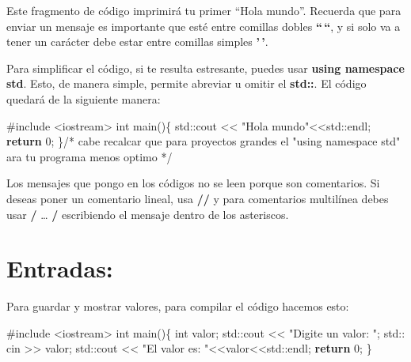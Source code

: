 \documentclass[
  11pt,
  a4paper,
  DIV=11,
  numbers=noendperiod]{scrreprt}
\newenvironment{Shaded}{\begin{snugshade}}{\end{snugshade}}
\newcommand{\BuiltInTok}[1]{\textcolor[rgb]{0.00,0.23,0.31}{#1}}
\newcommand{\CommentTok}[1]{\textcolor[rgb]{0.37,0.37,0.37}{#1}}
\newcommand{\ControlFlowTok}[1]{\textcolor[rgb]{0.00,0.23,0.31}{\textbf{#1}}}
\newcommand{\DataTypeTok}[1]{\textcolor[rgb]{0.68,0.00,0.00}{#1}}
\newcommand{\DecValTok}[1]{\textcolor[rgb]{0.68,0.00,0.00}{#1}}
\newcommand{\ImportTok}[1]{\textcolor[rgb]{0.00,0.46,0.62}{#1}}
\newcommand{\NormalTok}[1]{\textcolor[rgb]{0.00,0.23,0.31}{#1}}
\newcommand{\OperatorTok}[1]{\textcolor[rgb]{0.37,0.37,0.37}{#1}}
\newcommand{\PreprocessorTok}[1]{\textcolor[rgb]{0.68,0.00,0.00}{#1}}
\newcommand{\StringTok}[1]{\textcolor[rgb]{0.13,0.47,0.30}{#1}}
\begin{document}
Este fragmento de código imprimirá tu primer ``Hola mundo''. Recuerda
que para enviar un mensaje es importante que esté entre comillas dobles
\textbf{``\,``}, y si solo va a tener un carácter debe estar entre
comillas simples \textbf{'\,'}.

Para simplificar el código, si te resulta estresante, puedes usar
\textbf{using namespace std}. Esto, de manera simple, permite abreviar u
omitir el \textbf{std::}. El código quedará de la siguiente manera:

\begin{Shaded}
\begin{Highlighting}[]
\PreprocessorTok{\#include }\ImportTok{\textless{}iostream\textgreater{}}
\DataTypeTok{int}\NormalTok{ main}\OperatorTok{()\{}
    \BuiltInTok{std::}\NormalTok{cout }\OperatorTok{\textless{}\textless{}} \StringTok{"Hola mundo"}\OperatorTok{\textless{}\textless{}}\BuiltInTok{std::}\NormalTok{endl}\OperatorTok{;}
    \ControlFlowTok{return} \DecValTok{0}\OperatorTok{;}
\OperatorTok{\}}\CommentTok{/* cabe recalcar que para proyectos grandes el "using namespace std" }
\CommentTok{ara tu programa menos optimo */}
\end{Highlighting}
\end{Shaded}

Los mensajes que pongo en los códigos no se leen porque son comentarios.
Si deseas poner un comentario lineal, usa \textbf{//} y para comentarios
multilínea debes usar \textbf{/} \ldots{} \textbf{/} escribiendo el
mensaje dentro de los asteriscos.

\section{Entradas:}\label{entradas}

Para guardar y mostrar valores, para compilar el código hacemos esto:

\begin{Shaded}
\begin{Highlighting}[]
\PreprocessorTok{\#include }\ImportTok{\textless{}iostream\textgreater{}}
\DataTypeTok{int}\NormalTok{ main}\OperatorTok{()\{}
    \DataTypeTok{int}\NormalTok{ valor}\OperatorTok{;}
    \BuiltInTok{std::}\NormalTok{cout }\OperatorTok{\textless{}\textless{}} \StringTok{"Digite un valor: "}\OperatorTok{;} 
    \BuiltInTok{std::}\NormalTok{ cin }\OperatorTok{\textgreater{}\textgreater{}}\NormalTok{ valor}\OperatorTok{;}
    \BuiltInTok{std::}\NormalTok{cout }\OperatorTok{\textless{}\textless{}} \StringTok{"El valor es: "}\OperatorTok{\textless{}\textless{}}\NormalTok{valor}\OperatorTok{\textless{}\textless{}}\BuiltInTok{std::}\NormalTok{endl}\OperatorTok{;}
    \ControlFlowTok{return} \DecValTok{0}\OperatorTok{;}
\OperatorTok{\}}
\end{Highlighting}
\end{Shaded}
\end{document}

